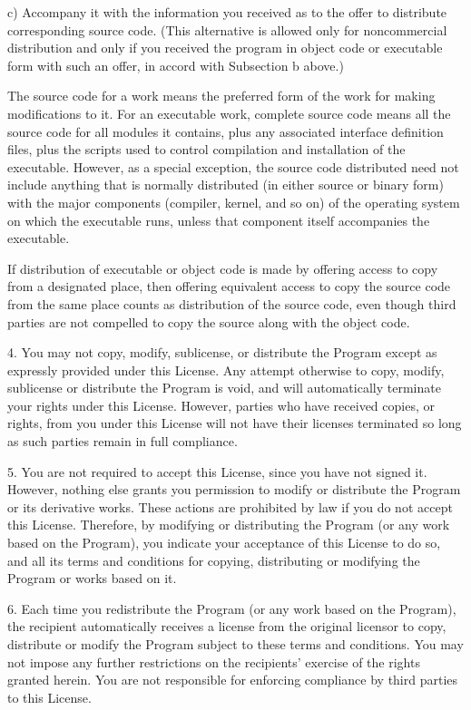 \documentclass{doc}
\begin{document}
    c) Accompany it with the information you received as to the offer
    to distribute corresponding source code.  (This alternative is
    allowed only for noncommercial distribution and only if you
    received the program in object code or executable form with such
    an offer, in accord with Subsection b above.)

The source code for a work means the preferred form of the work for
making modifications to it.  For an executable work, complete source
code means all the source code for all modules it contains, plus any
associated interface definition files, plus the scripts used to
control compilation and installation of the executable.  However, as a
special exception, the source code distributed need not include
anything that is normally distributed (in either source or binary
form) with the major components (compiler, kernel, and so on) of the
operating system on which the executable runs, unless that component
itself accompanies the executable.

If distribution of executable or object code is made by offering
access to copy from a designated place, then offering equivalent
access to copy the source code from the same place counts as
distribution of the source code, even though third parties are not
compelled to copy the source along with the object code.

  4. You may not copy, modify, sublicense, or distribute the Program
except as expressly provided under this License.  Any attempt
otherwise to copy, modify, sublicense or distribute the Program is
void, and will automatically terminate your rights under this License.
However, parties who have received copies, or rights, from you under
this License will not have their licenses terminated so long as such
parties remain in full compliance.

  5. You are not required to accept this License, since you have not
signed it.  However, nothing else grants you permission to modify or
distribute the Program or its derivative works.  These actions are
prohibited by law if you do not accept this License.  Therefore, by
modifying or distributing the Program (or any work based on the
Program), you indicate your acceptance of this License to do so, and
all its terms and conditions for copying, distributing or modifying
the Program or works based on it.

  6. Each time you redistribute the Program (or any work based on the
Program), the recipient automatically receives a license from the
original licensor to copy, distribute or modify the Program subject to
these terms and conditions.  You may not impose any further
restrictions on the recipients' exercise of the rights granted herein.
You are not responsible for enforcing compliance by third parties to
this License.
\end{document}
